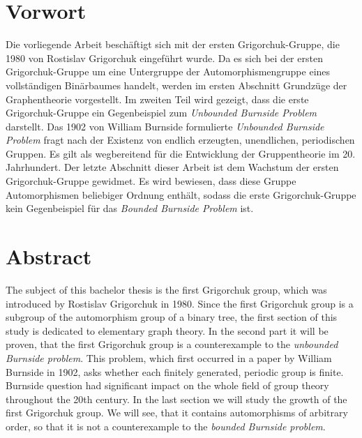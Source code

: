 \newpage

\thispagestyle{empty}

\renewcommand{\thepage}{}

\section*{Vorwort}
Die vorliegende Arbeit besch\"aftigt sich mit der ersten Grigorchuk-Gruppe, die 1980 von Rostislav Grigorchuk eingef\"uhrt wurde. Da es sich bei der ersten Grigorchuk-Gruppe um eine Untergruppe der Automorphismengruppe eines vollst\"andigen Bin\"arbaumes handelt, werden im ersten Abschnitt Grundz\"uge der Graphentheorie vorgestellt. Im zweiten Teil wird gezeigt, dass die erste Grigorchuk-Gruppe ein Gegenbeispiel zum \emph{Unbounded Burnside Problem} darstellt. Das 1902 von William Burnside formulierte \emph{Unbounded Burnside Problem} fragt nach der Existenz von  endlich erzeugten, unendlichen, periodischen Gruppen. Es gilt als wegbereitend f\"ur die Entwicklung der Gruppentheorie im 20. Jahrhundert. Der letzte Abschnitt dieser Arbeit ist dem Wachstum der ersten Grigorchuk-Gruppe gewidmet. Es wird bewiesen, dass diese Gruppe Automorphismen beliebiger Ordnung enth\"alt, sodass die erste Grigorchuk-Gruppe kein Gegenbeispiel f\"ur das \emph{Bounded Burnside Problem} ist.
\vspace{1.5cm}
\section*{Abstract}
The subject of this bachelor thesis is the first Grigorchuk group, which was introduced by Rostislav Grigorchuk in 1980. Since the first Grigorchuk group is a subgroup of the automorphism group of a binary tree, the first section of this study is dedicated to elementary graph theory. In the second part it will be proven, that the first Grigorchuk group is a counterexample to the \emph{unbounded Burnside problem}. This problem, which first occurred in a paper by William Burnside in 1902, asks whether each finitely generated, periodic group is finite. Burnside question had significant impact on the whole field of group theory throughout the 20th century. In the last section we will study the growth of the first Grigorchuk group. We will see, that it contains automorphisms of arbitrary order, so that it is not a counterexample to the \emph{bounded Burnside problem}.
\newpage
\thispagestyle{empty}
\tableofcontents